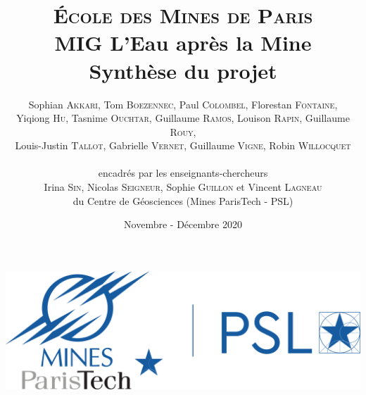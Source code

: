 \documentclass{article}
\title{ \textbf{ {\color{couleurmines}
\Huge{\textsc{École des Mines de Paris}}\\
\vspace{1.5 cm}
MIG L'Eau après la Mine\\\vspace{1 cm}Synthèse du projet}}
\vspace{1 cm}
}
\author{
Sophian \textsc{Akkari},
Tom \textsc{Boezennec}, 
Paul \textsc{Colombel}, 
Florestan \textsc{Fontaine},\\
Yiqiong \textsc{Hu}, 
Tasnime \textsc{Ouchtar}, 
Guillaume \textsc{Ramos}, 
Louison \textsc{Rapin}, 
Guillaume \textsc{Rouy},\\ 
Louis-Justin \textsc{Tallot}, 
Gabrielle \textsc{Vernet}, 
Guillaume \textsc{Vigne}, 
Robin \textsc{Willocquet}\\
\\
encadrés par les enseignants-chercheurs \\
Irina \textsc{Sin}, 
Nicolas \textsc{Seigneur},
Sophie \textsc{Guillon}
et Vincent \textsc{Lagneau} \\
du Centre de Géosciences (Mines ParisTech - PSL)}
\date{Novembre - Décembre 2020}
\begin{document}

\maketitle
\thispagestyle{empty}
\vspace{1 cm}
\begin{center}
    \includegraphics[width = 0.4\linewidth]{logoMPT.png}
\end{center}
\newpage
{}
\end{document}
